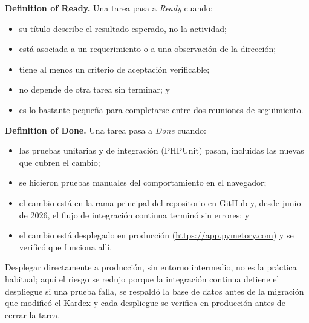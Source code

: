 \textbf{Definition of Ready.} Una tarea pasa a \textit{Ready} cuando:
\begin{itemize}
    \item su título describe el resultado esperado, no la actividad;
    \item está asociada a un requerimiento o a una observación de la dirección;
    \item tiene al menos un criterio de aceptación verificable;
    \item no depende de otra tarea sin terminar; y
    \item es lo bastante pequeña para completarse entre dos reuniones de seguimiento.
\end{itemize}

\textbf{Definition of Done.} Una tarea pasa a \textit{Done} cuando:
\begin{itemize}
    \item las pruebas unitarias y de integración (PHPUnit) pasan, incluidas las nuevas que cubren el cambio;
    \item se hicieron pruebas manuales del comportamiento en el navegador;
    \item el cambio está en la rama principal del repositorio en GitHub y, desde junio de 2026, el flujo de integración continua terminó sin errores; y
    \item el cambio está desplegado en producción (\url{https://app.pymetory.com}) y se verificó que funciona allí.
\end{itemize}

Desplegar directamente a producción, sin entorno intermedio, no es la práctica habitual; aquí el riesgo se redujo porque la integración continua detiene el despliegue si una prueba falla, se respaldó la base de datos antes de la migración que modificó el Kardex y cada despliegue se verifica en producción antes de cerrar la tarea.
